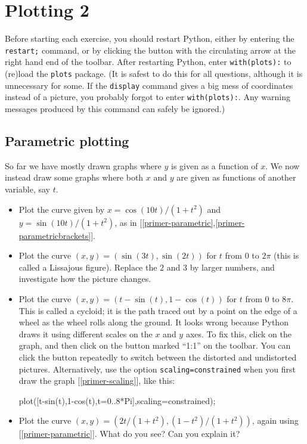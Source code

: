 \documentclass[a4paper,10pt]{amsbook}
\begin{document}
\chapter{Plotting 2}

Before starting each exercise, you should restart Python, either by
entering the \verb~restart;~ command, or by clicking the button with
the circulating arrow at the right hand end of the toolbar.  After
restarting Python, enter \verb~with(plots):~ to (re)load the
\verb~plots~ package.  (It is safest to do this for all questions,
although it is unnecessary for some.  If the \verb~display~ command
gives a big mess of coordinates instead of a picture, you probably
forgot to enter \verb~with(plots):~.  Any warning messages produced by
this command can safely be ignored.)

\section{Parametric plotting}

So far we have mostly drawn graphs where $y$ is given as a function of
$x$.  We now instead draw some graphs where both $x$ and $y$ are given
as functions of another variable, say $t$.

\begin{exercise}
 \begin{itemize}
  \item[(a)]
   Plot the curve given by $x=\cos(10t)/(1+t^2)$ and $y=\sin(10t)/(1+t^2)$,
   as in [\ref{primer-parametric},\ref{primer-parametricbrackets}].
  \item[(b)]
   Plot the curve $(x,y)=(\sin(3t),\sin(2t))$ for $t$ from $0$ to
   $2\pi$ (this is called a Lissajous figure).  Replace the $2$ and
   $3$ by larger numbers, and investigate how the picture changes.
  \item[(c)]
   Plot the curve $(x,y)=(t-\sin(t),1-\cos(t))$ for $t$ from $0$ to
   $8\pi$.  This is called a cycloid; it is the path traced out by a
   point on the edge of a wheel as the wheel rolls along the ground.
   It looks wrong because Python draws it using different scales on the
   $x$ and $y$ axes.  To fix this, click on the graph, and then click
   on the button marked ``1:1'' on the toolbar.  You can click the
   button repeatedly to switch between the distorted and undistorted
   pictures.  Alternatively, use the option \verb~scaling=constrained~
   when you first draw the graph [\ref{primer-scaling}], like this:
\begin{pcodeblock}
  plot([t-sin(t),1-cos(t),t=0..8*Pi],scaling=constrained);
\end{pcodeblock}
  \item[(d)] Plot the curve
   $(x,y)=(2t/(1+t^2),(1-t^2)/(1+t^2))$, again using
   [\ref{primer-parametric}].  What do you see?  Can you
   explain it?
 \end{itemize}
\end{exercise}
\end{document}
